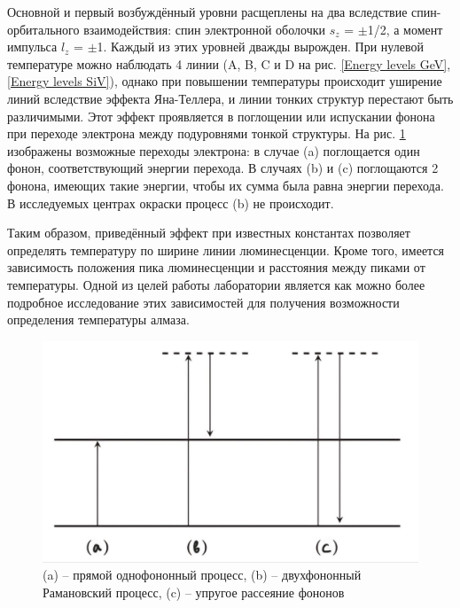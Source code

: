 Основной и первый возбуждённый уровни расщеплены на два вследствие
спин-орбитального взаимодействия: спин электронной оболочки $s_z$ = $\pm$1/2,
а момент импульса $l_z$ = $\pm$1. Каждый из этих уровней дважды вырожден.
При нулевой температуре можно наблюдать
4 линии (A, B, C и D на рис. \ref{Energy levels GeV}, \ref{Energy levels SiV}), 
однако при повышении температуры
происходит уширение линий вследствие эффекта Яна-Теллера, и линии тонких структур
перестают быть различимыми. Этот эффект
проявляется в поглощении или испускании фонона при переходе электрона между
подуровнями тонкой структуры. На рис. \ref{J-T effect} изображены возможные переходы электрона:
в случае (a) поглощается один фонон, соответствующий энергии перехода. В случаях
(b) и (c) поглощаются 2 фонона, имеющих такие энергии, чтобы их сумма была 
равна энергии перехода. В исследуемых центрах окраски процесс (b) не происходит.

Таким образом, приведённый эффект при известных константах позволяет определять 
температуру по ширине линии люминесценции. Кроме того, имеется зависимость 
положения пика люминесценции и расстояния между пиками от температуры. Одной из целей 
работы лаборатории является как можно более подробное исследование этих зависимостей для
получения возможности определения температуры алмаза.

\begin{figure}[!h]
    \begin{center}
        \includegraphics[width=0.5 \linewidth]{Jahn-Teller effect.jpg}
        \caption{(a) -- прямой однофононный процесс, (b) -- двухфононный
        Рамановский процесс, (c) -- упругое рассеяние фононов}
        \label{J-T effect}
    \end{center}
\end{figure}


